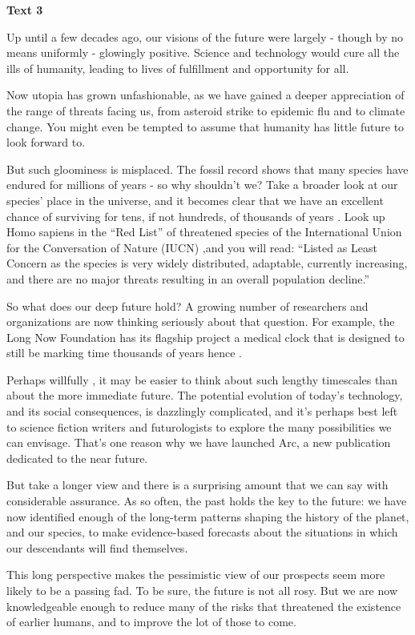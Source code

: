 \textbf{Text 3}

Up until a few decades ago, our visions of the future were largely - though by no means uniformly - glowingly positive. Science and technology would cure all the ills of humanity, leading to lives of fulfillment and opportunity for all.

Now utopia has grown unfashionable, as we have gained a deeper appreciation of the range of threats facing us, from asteroid strike to epidemic flu and to climate change. You might even be tempted to assume that humanity has little future to look forward to.

But such gloominess is misplaced. The fossil record shows that many species have endured for millions of years - so why shouldn't we? Take a broader look at our species' place in the universe, and it becomes clear that we have an excellent chance of surviving for tens, if not hundreds, of thousands of years . Look up Homo sapiens in the ``Red List'' of threatened species of the International Union for the Conversation of Nature (IUCN) ,and you will read: ``Listed as Least Concern as the species is very widely distributed, adaptable, currently increasing, and there are no major threats resulting in an overall population decline.''

So what does our deep future hold? A growing number of researchers and organizations are now thinking seriously about that question. For example, the Long Now Foundation has its flagship project a medical clock that is designed to still be marking time thousands of years hence .

Perhaps willfully , it may be easier to think about such lengthy timescales than about the more immediate future. The potential evolution of today's technology, and its social consequences, is dazzlingly complicated, and it's perhaps best left to science fiction writers and futurologists to explore the many possibilities we can envisage. That's one reason why we have launched Arc, a new publication dedicated to the near future.

But take a longer view and there is a surprising amount that we can say with considerable assurance. As so often, the past holds the key to the future: we have now identified enough of the long-term patterns shaping the history of the planet, and our species, to make evidence-based forecasts about the situations in which our descendants will find themselves.

This long perspective makes the pessimistic view of our prospects seem more likely to be a passing fad. To be sure, the future is not all rosy. But we are now knowledgeable enough to reduce many of the risks that threatened the existence of earlier humans, and to improve the lot of those to come.

